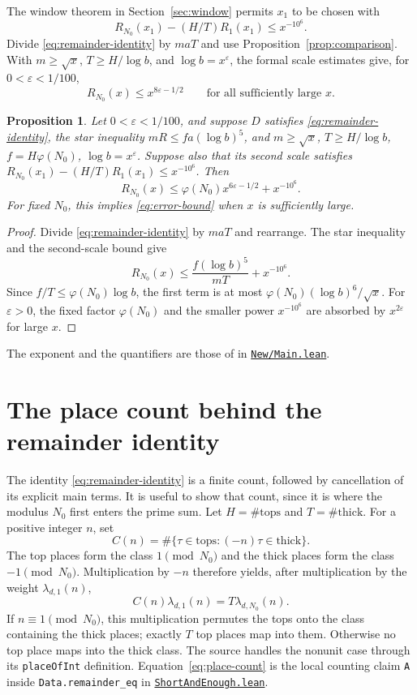 \documentclass[11pt,oneside,openany]{amsbook}
\newtheorem{proposition}[theorem]{Proposition}
\theoremstyle{remark}
\numberwithin{equation}{section}
\newcommand{\eps}{\varepsilon}
\newcommand{\ghroot}{https://github.com/lsernau/grh-lean/blob/}
\newcommand{\ghrev}{72fead102f663d5c7a407964a13dc0cf9d977207}
\newcommand{\leanfile}[2]{%
  \href{\ghroot\ghrev/grh-compact/src/#1}{\nolinkurl{#2}}}
\begin{document}
The window theorem in Section~\ref{sec:window} permits $x_1$ to be
chosen with
\[
R_{N_0}(x_1)-(H/T)R_1(x_1)\le x^{-10^6}.
\]
Divide \eqref{eq:remainder-identity} by $maT$ and use
Proposition~\ref{prop:comparison}. With $m\ge\sqrt{x}$,
$T\ge H/\log b$, and $\log b=x^\eps$, the formal scale estimates
give, for $0<\eps<1/100$,
\begin{equation}
\label{eq:error-bound}
R_{N_0}(x)\le x^{8\eps-1/2}
\qquad\text{for all sufficiently large }x.
\end{equation}
\begin{proposition}
\label{prop:one-sided-scale}
Let $0<\eps<1/100$, and suppose $D$ satisfies
\eqref{eq:remainder-identity}, the star inequality
$mR\le f a(\log b)^5$, and
$m\ge\sqrt x$, $T\ge H/\log b$, $f=H\varphi(N_0)$,
$\log b=x^\eps$. Suppose also that its second scale
satisfies
$R_{N_0}(x_1)-(H/T)R_1(x_1)\le x^{-10^6}$.
Then
\[
R_{N_0}(x)\le
 \varphi(N_0)x^{6\eps-1/2}+x^{-10^6}.
\]
For fixed $N_0$, this implies \eqref{eq:error-bound}
when $x$ is sufficiently large.
\end{proposition}
\begin{proof}
Divide \eqref{eq:remainder-identity} by $maT$ and
rearrange. The star inequality and the second-scale
bound give
\[
R_{N_0}(x)\le\frac{f(\log b)^5}{mT}
 +x^{-10^6}.
\]
Since $f/T\le\varphi(N_0)\log b$, the first term is
at most $\varphi(N_0)(\log b)^6/\sqrt x$.
For $\eps>0$, the fixed factor $\varphi(N_0)$ and
the smaller power $x^{-10^6}$ are absorbed by
$x^{2\eps}$ for large $x$.
\end{proof}
The exponent and the quantifiers are those of
 in
\leanfile{New/Main.lean}{New/Main.lean}.

\section{The place count behind the remainder identity}
\label{sec:remainder-proof}
The identity \eqref{eq:remainder-identity} is a finite
count, followed by cancellation of its explicit main
terms. It is useful to show that count, since it is where
the modulus $N_0$ first enters the prime sum. Let
$H=\#\mathrm{tops}$ and $T=\#\mathrm{thick}$.
For a positive integer $n$, set
\[
C(n)=\#\{\tau\in\mathrm{tops}:
       (-n)\tau\in\mathrm{thick}\}.
\]
The top places form the class $1\pmod{N_0}$ and the
thick places form the class $-1\pmod{N_0}$.
Multiplication by $-n$ therefore yields, after
multiplication by the weight $\lambda_{d,1}(n)$,
\begin{equation}
\label{eq:place-count}
C(n)\lambda_{d,1}(n)
 =T\lambda_{d,N_0}(n).
\end{equation}
If $n\equiv1\pmod{N_0}$, this multiplication permutes
the tops onto the class containing the thick places;
exactly $T$ top places map into them. Otherwise no top
place maps into the thick class. The source handles the
nonunit case through its \texttt{placeOfInt} definition.
Equation~\eqref{eq:place-count} is the local counting
claim \texttt{A} inside \texttt{Data.remainder\_eq} in
\leanfile{New/Endgame/ShortAndEnough.lean}%
{ShortAndEnough.lean}.
\end{document}
